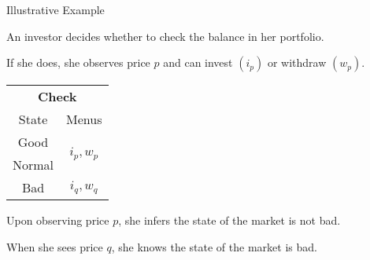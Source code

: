 \documentclass[usenames,dvipsnames,aspectratio=169,11pt, envcountsect, handout]{beamer}
\begin{document}
\begin{frame}{Illustrative Example}

	An investor decides whether to check the balance in her portfolio.

	\vfill

	If she does, she observes price \( p \) and can invest \( \left( i_{p} \right) \) or withdraw \( \left( w_p \right) \). \pause

	\vfill

	\begin{table}[H]
		\centering
		\begin{minipage}{0.29\textwidth}

		\end{minipage}\hspace{0.3cm} %
		\begin{minipage}{0.29\textwidth}
			\centering
			\begin{tabular}{c | c}
				\multicolumn{2}{c}{\textbf{Check}}                                     \\
				State                & Menus                                           \\
				\hline
				{\color{blue}Good}   & \multirow{2}{*}{{\color{blue}\( i_{p}, w_p \)}} \\
				{\color{blue}Normal} &                                                 \\
				Bad                  & \(  i_{q}, w_q \)                               \\
			\end{tabular}
			\vspace{0.5cm} %
		\end{minipage}\hspace{0.3cm} %
		\begin{minipage}{0.29\textwidth}

		\end{minipage}
	\end{table} \pause

	\vfill

	Upon observing price \( p \), she infers the state of the market is not bad.

	\vfill

	When she sees price \( q \), she knows the state of the market is bad.

\end{frame}
\end{document}
